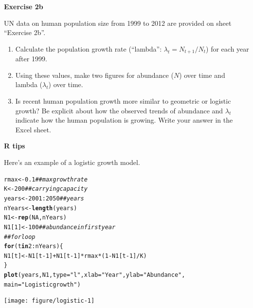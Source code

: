 \documentclass[12pt]{article}\usepackage[]{graphicx}\usepackage[]{color}
\makeatletter
\newcommand{\hlnum}[1]{\textcolor[rgb]{0.686,0.059,0.569}{#1}}%
\newcommand{\hlstr}[1]{\textcolor[rgb]{0.192,0.494,0.8}{#1}}%
\newcommand{\hlcom}[1]{\textcolor[rgb]{0.678,0.584,0.686}{\textit{#1}}}%
\newcommand{\hlopt}[1]{\textcolor[rgb]{0,0,0}{#1}}%
\newcommand{\hlstd}[1]{\textcolor[rgb]{0.345,0.345,0.345}{#1}}%
\newcommand{\hlkwa}[1]{\textcolor[rgb]{0.161,0.373,0.58}{\textbf{#1}}}%
\newcommand{\hlkwb}[1]{\textcolor[rgb]{0.69,0.353,0.396}{#1}}%
\newcommand{\hlkwc}[1]{\textcolor[rgb]{0.333,0.667,0.333}{#1}}%
\newcommand{\hlkwd}[1]{\textcolor[rgb]{0.737,0.353,0.396}{\textbf{#1}}}%
\newenvironment{kframe}{%
 \def\at@end@of@kframe{}%
 \ifinner\ifhmode%
  \def\at@end@of@kframe{\end{minipage}}%
  \begin{minipage}{\columnwidth}%
 \fi\fi%
 \def\FrameCommand##1{\hskip\@totalleftmargin \hskip-\fboxsep
 \colorbox{shadecolor}{##1}\hskip-\fboxsep
     \hskip-\linewidth \hskip-\@totalleftmargin \hskip\columnwidth}%
 \MakeFramed {\advance\hsize-\width
   \@totalleftmargin\z@ \linewidth\hsize
   \@setminipage}}%
 {\par\unskip\endMakeFramed%
 \at@end@of@kframe}
\newenvironment{knitrout}{}{} %
\makeatother
\begin{document}
\vspace{24pt}

{\bf Exercise 2b \\}


UN data on human population size from 1999 to 2012 are provided on
sheet ``Exercise 2b''.


\begin{enumerate}
  \item Calculate the population growth rate (``lambda'':
    $\lambda_t = N_{t+1}/N_t$) for each year after 1999.
  \item Using these values, make two figures for abundance ($N$) over
    time and lambda ($\lambda_t$) over time. 
  \item Is recent human population growth more similar to geometric or
    logistic growth? Be explicit about how the observed trends of
    abundance and $\lambda_t$ indicate how the human population is
    growing. Write your answer in the Excel sheet.
\end{enumerate}



\newpage

{\bf R tips \\}


Here's an example of a logistic growth model.
\begin{knitrout}
\color{fgcolor}\begin{kframe}
\begin{alltt}
\hlstd{rmax} \hlkwb{<-} \hlnum{0.1}              \hlcom{## max growth rate}
\hlstd{K} \hlkwb{<-} \hlnum{200}                 \hlcom{## carrying capacity}
\hlstd{years} \hlkwb{<-} \hlnum{2001}\hlopt{:}\hlnum{2050}       \hlcom{## years}
\hlstd{nYears} \hlkwb{<-} \hlkwd{length}\hlstd{(years)}
\hlstd{N1} \hlkwb{<-} \hlkwd{rep}\hlstd{(}\hlnum{NA}\hlstd{, nYears)}
\hlstd{N1[}\hlnum{1}\hlstd{]} \hlkwb{<-} \hlnum{100}             \hlcom{## abundance in first year}
\hlcom{## for loop}
\hlkwa{for}\hlstd{(t} \hlkwa{in} \hlnum{2}\hlopt{:}\hlstd{nYears) \{}
    \hlstd{N1[t]} \hlkwb{<-} \hlstd{N1[t}\hlopt{-}\hlnum{1}\hlstd{]} \hlopt{+} \hlstd{N1[t}\hlopt{-}\hlnum{1}\hlstd{]}\hlopt{*}\hlstd{rmax}\hlopt{*}\hlstd{(}\hlnum{1} \hlopt{-} \hlstd{N1[t}\hlopt{-}\hlnum{1}\hlstd{]}\hlopt{/}\hlstd{K)}
\hlstd{\}}
\hlkwd{plot}\hlstd{(years, N1,} \hlkwc{type}\hlstd{=}\hlstr{"l"}\hlstd{,} \hlkwc{xlab}\hlstd{=}\hlstr{"Year"}\hlstd{,} \hlkwc{ylab}\hlstd{=}\hlstr{"Abundance"}\hlstd{,}
     \hlkwc{main}\hlstd{=}\hlstr{"Logistic growth"}\hlstd{)}
\end{alltt}
\end{kframe}

{\centering \texttt{[image: figure/logistic-1]} 

}


\end{knitrout}
\end{document}
